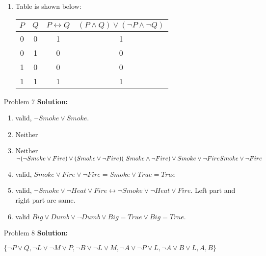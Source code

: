 \normalfont\documentclass[letterpaper,11pt]{article}
\begin{document}
\begin{enumerate}
\begin{enumerate}
		\item Table is shown below:\par
		\begin{tabular}{c|c|c|c}
			\hline
			$P$ & $Q$ & $P \leftrightarrow Q$ & $ (P \land Q)\lor(\neg P \land \neg Q)$ \\
			\hline
			0 & 0 & 1 & 1 \\
			0 & 1 & 0 & 0 \\
			1 & 0 & 0 & 0 \\
			1 & 1 & 1 & 1 \\
		\end{tabular}
	\end{enumerate}
\item[Problem 7]\textbf{Solution:}\par
	\begin{enumerate}
		\item valid, $\neg Smoke \lor Smoke$.
		\item Neither
		\item Neither
			$\neg(\neg Smoke \lor Fire)\lor(Smoke\lor \neg Fire) \\ (\ Smoke \land \neg Fire)\lor Smoke\lor \neg Fire\\Smoke\lor \neg Fire$\\
		 
		\item valid, $Smoke \lor Fire \lor \neg Fire = Smoke \lor True = True$
		\item valid, $\neg Smoke \lor \neg Heat \lor Fire \leftrightarrow \neg Smoke \lor \neg Heat \lor Fire$. Left part and right part are same.
		\item valid $Big \lor Dumb \lor \neg Dumb \lor Big = True \lor Big = True$.
	\end{enumerate}
\item[Problem 8]\textbf{Solution:}\par
	$\{\neg P \lor Q, \neg L \lor \neg M \lor P, \neg B \lor \neg L \lor M, \neg A\lor \neg P \lor L,\neg A \lor B \lor L, A, B\}$\\
	
\end{enumerate}
\end{document}
